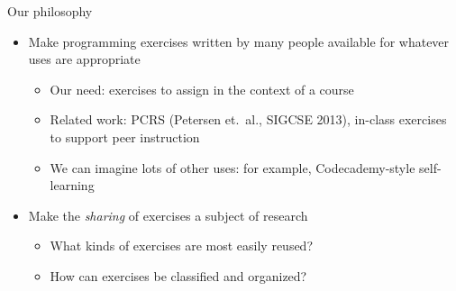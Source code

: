 \documentclass{beamer}
\begin{document}
\begin{frame}{Our philosophy}

\begin{itemize}
  \item Make programming exercises written by many people available
        for whatever uses are appropriate
  \begin{itemize}
    \item Our need: exercises to assign in the context of a course
    \item Related work: PCRS (Petersen et.\ al., SIGCSE 2013), in-class
          exercises to support peer instruction
    \item We can imagine lots of other uses: for example, Codecademy-style
          self-learning
  \end{itemize}
  \item Make the {\em sharing} of exercises a subject of research
  \begin{itemize}
    \item What kinds of exercises are most easily reused?
    \item How can exercises be classified and organized?
  \end{itemize}
\end{itemize}

\end{frame}


%
%
%
%
%
%
\end{document}
